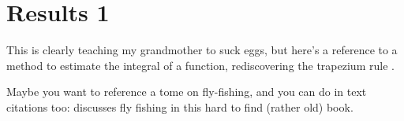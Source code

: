 \chapter{Results 1}

This is clearly teaching my grandmother to suck eggs, but here's a reference to a method to estimate the integral of a function, rediscovering the trapezium rule \citep{10.2337/diacare.17.2.152}.

Maybe you want to reference a tome on fly-fishing, and you can do in text citations too: \citet{Hartley1991} discusses fly fishing in this hard to find (rather old) book.